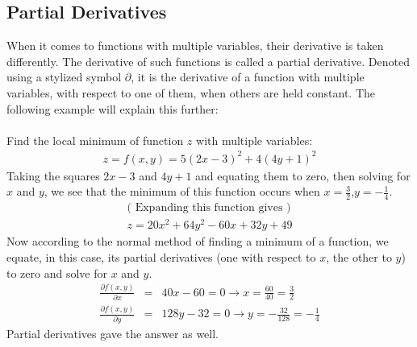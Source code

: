 \subsection{Partial Derivatives}
When it comes to functions with multiple variables, their derivative is taken differently. The derivative of such functions is called a partial derivative. Denoted using a stylized symbol $\partial$, it is the derivative of a function with multiple variables, with respect to one of them, when others are held constant.  \cite[pages 45-48]{matthews_1998}   \cite[pages 878-891]{stewart_2008_deriv} The following example will explain this further:\\
\\
Find the local minimum of function $z$ with multiple variables:
\begin{gather*}
z = f(x,y) = 5(2x-3)^{2} + 4(4y+1)^{2}
\end{gather*}
Taking the squares $2x-3$ and $4y+1$ and equating them to zero, then solving for $x$ and $y$, we see that the minimum of this function occurs when $x= \frac{3}{2} $,$ y= -\frac{1}{4}$.
\begin{gather*}
\text{( Expanding this function gives )}\\
z = 20x^{2} + 64y^{2} -60x + 32y +49
\end{gather*}
Now according to the normal method of finding a minimum of a function, we equate, in this case, its partial derivatives (one with respect to $x$, the other to $y$) to zero and solve for $x$ and $y$.
\begin{eqnarray*}
\frac{\partial f(x,y)}{\partial x}  &=&  40x-60 = 0 \rightarrow x = \frac{60}{40}=\frac{3}{2}\\
\frac{\partial f(x,y)}{\partial y}  &=&  128y-32 = 0 \rightarrow y = -\frac{32}{128}=-\frac{1}{4}
\end{eqnarray*}
Partial derivatives gave the answer as well.

